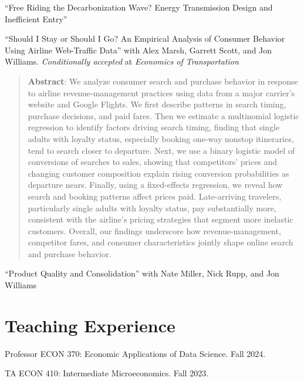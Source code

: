\documentclass[12pt,letterpaper]{report}
\newcommand{\listitemspace}{0.25em}
\renewenvironment{itemize}
{\begin{list}{}{\setlength{\leftmargin}{0em}
			\setlength{\parskip}{0em}
			\setlength{\itemsep}{\listitemspace}
			\setlength{\parsep}{\listitemspace}}}
	{\end{list}}
\begin{document}
    \begin{itemize}
		\item ``Free Riding the Decarbonization Wave? Energy Transmission Design and Inefficient Entry''
        \item ``Should I Stay or Should I Go? An Empirical Analysis of Consumer Behavior Using Airline Web-Traffic Data'' with Alex Marsh, Garrett Scott, and Jon Williams. \textit{Conditionally accepted} at \textit{Economics of Transportation}
        \begin{quote}
			\textbf{Abstract}: We analyze consumer search and purchase behavior in response to airline revenue-management practices using data from a major carrier's website and Google Flights. We first describe patterns in search timing, purchase decisions, and paid fares. Then we estimate a multinomial logistic regression to identify factors driving search timing, finding that single adults with loyalty status, especially booking one-way nonstop itineraries, tend to search closer to departure. Next, we use a binary logistic model of conversions of searches to sales, showing that competitors' prices and changing customer composition explain rising conversion probabilities as departure nears. Finally, using a fixed-effects regression, we reveal how search and booking patterns affect prices paid. Late-arriving travelers, particularly single adults with loyalty status, pay substantially more, consistent with the airline's pricing strategies that segment more inelastic customers. Overall, our findings underscore how revenue-management, competitor fares, and consumer characteristics jointly shape online search and purchase behavior.
		\end{quote}
        \item ``Product Quality and Consolidation'' with Nate Miller, Nick Rupp, and Jon Williams
    \end{itemize}

	\section*{Teaching Experience}
	
	\begin{tablist}
        \item[Professor] \tab{}ECON 370: Economic Applications of Data Science. Fall 2024.
		\item[TA] \tab{}ECON 410: Intermediate Microeconomics. Fall 2023.
	\end{tablist}
\end{document}
